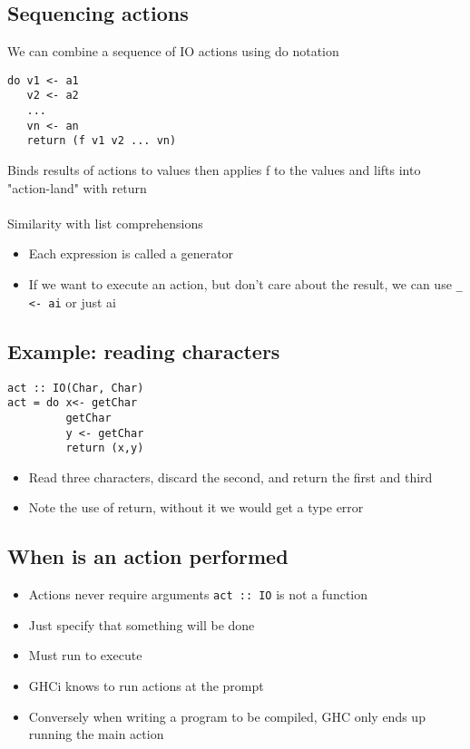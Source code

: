 \documentclass{article}[18pt]
\begin{document}
\subsection{Sequencing actions}
We can combine a sequence of IO actions using do notation
\begin{verbatim}
do v1 <- a1
   v2 <- a2
   ...
   vn <- an
   return (f v1 v2 ... vn)
\end{verbatim}
Binds results of actions to values then applies f to the values and lifts into "action-land" with return\\
\\
Similarity with list comprehensions
\begin{itemize}
	\item Each expression is called a generator
	\item If we want to execute an action, but don't care about the result, we can use \texttt{_ <- ai} or just ai
\end{itemize}
\subsection{Example: reading characters}
\begin{verbatim}
act :: IO(Char, Char)
act = do x<- getChar
         getChar
         y <- getChar
         return (x,y)
\end{verbatim}
\begin{itemize}
	\item Read three characters, discard the second, and return the first and third
	\item Note the use of return, without it we would get a type error
\end{itemize}
\subsection{When is an action performed}
\begin{itemize}
	\item Actions never require arguments \texttt{act :: IO} is not a function
	\item Just specify that something will be done
	\item Must run to execute
	\item GHCi knows to run actions at the prompt
	\item Conversely when writing a program to be compiled, GHC only ends up running the main action
\end{itemize}
\end{document}
